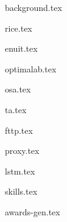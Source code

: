 \documentclass[11pt]{article}
\begin{document}
{background.tex}


{rice.tex}


{enuit.tex}


{optimalab.tex}

{osa.tex}

{ta.tex}


{fttp.tex}




{proxy.tex}

{lstm.tex}


{skills.tex}


{awards-gen.tex}
\end{document}
